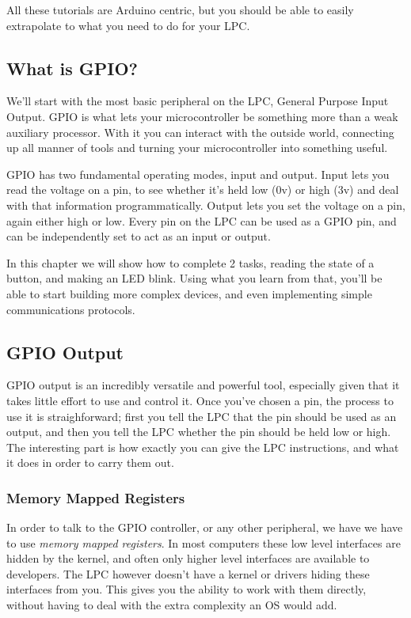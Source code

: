 \documentclass[]{article}
\begin{document}
All these tutorials are Arduino centric, but you should be able to
easily extrapolate to what you need to do for your LPC.

\subsection{What is GPIO?}

We'll start with the most basic peripheral on the LPC, General Purpose
Input Output. GPIO is what lets your microcontroller be something more
than a weak auxiliary processor. With it you can interact with the
outside world, connecting up all manner of tools and turning your
microcontroller into something useful.

GPIO has two fundamental operating modes, input and output. Input lets
you read the voltage on a pin, to see whether it's held low (0v) or high
(3v) and deal with that information programmatically. Output lets you
set the voltage on a pin, again either high or low. Every pin on the LPC
can be used as a GPIO pin, and can be independently set to act as an
input or output.

In this chapter we will show how to complete 2 tasks, reading the state
of a button, and making an LED blink. Using what you learn from that,
you'll be able to start building more complex devices, and even
implementing simple communications protocols.

\subsection{GPIO Output}

GPIO output is an incredibly versatile and powerful tool, especially
given that it takes little effort to use and control it. Once you've
chosen a pin, the process to use it is straighforward; first you tell
the LPC that the pin should be used as an output, and then you tell the
LPC whether the pin should be held low or high. The interesting part is
how exactly you can give the LPC instructions, and what it does in order
to carry them out.

\subsubsection{Memory Mapped Registers}

In order to talk to the GPIO controller, or any other peripheral, we
have we have to use \emph{memory mapped registers}. In most computers
these low level interfaces are hidden by the kernel, and often only
higher level interfaces are available to developers. The LPC however
doesn't have a kernel or drivers hiding these interfaces from you. This
gives you the ability to work with them directly, without having to deal
with the extra complexity an OS would add.
\end{document}
